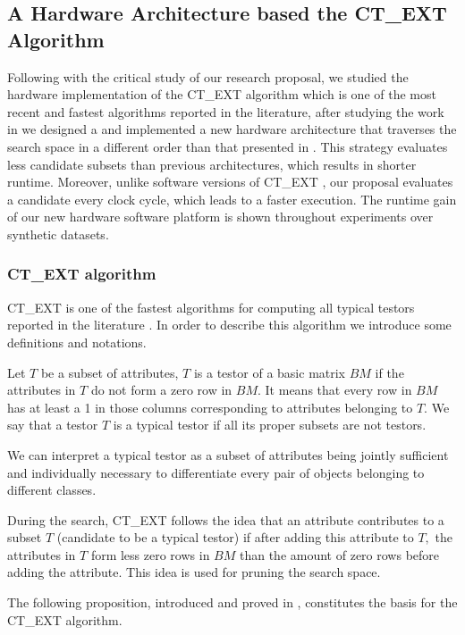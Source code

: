 \documentclass[authoryear,11pt]{elsarticle}
\begin{document}
\subsection{A Hardware Architecture based the CT\_EXT Algorithm}\label{CTH}
	Following with the critical study of our research proposal, we studied the hardware implementation of the 
	CT\_EXT algorithm which is one of the most recent and fastest algorithms reported in the literature, after
	studying the work in \citep{Rojas12} we designed a and implemented a new hardware architecture that traverses
	the search space in a different order than that presented in \citep{Rojas07, Rojas12,Rodriguez14}.
	This strategy evaluates less
	candidate subsets than previous architectures, which results in shorter runtime. Moreover, unlike 
	software versions of CT\_EXT \citep{Sanchez07, Sanchez10}, our proposal evaluates a candidate every clock 
	cycle, which leads to a faster execution. The runtime gain of our new hardware software platform is
	shown throughout	experiments over synthetic datasets.
	
\subsubsection{CT\_EXT algorithm}
	CT\_EXT is one of the fastest algorithms for computing all typical testors reported in the 
	literature \citep{Sanchez07,Sanchez10,Piza14}. In order to describe this algorithm we 
	introduce some definitions and notations.	
	
	Let $T$ be a subset of attributes, $T$ is a testor of a basic matrix $BM$ if the attributes in $T$ do 
	not form a zero row 	in $BM$. It means that every row in $BM$ has at least a 1 in those columns corresponding 
	to attributes belonging to $T$. We say that a testor $T$ is a typical testor if all its proper subsets 
	are not	testors.
	
	We can interpret a typical testor as a subset of attributes being jointly sufficient and individually
	necessary to differentiate every pair of objects belonging to different classes.
	
	During the search, CT\_EXT follows the idea that an attribute contributes to a subset $T$ (candidate to 
	be a typical testor) if after adding this attribute to $T,$ the attributes in $T$ form less zero rows 
	in $BM$ than the amount of zero rows before adding the attribute. This idea is used for pruning the search
	space.
	
	The following proposition, introduced and proved in \citep{Sanchez07}, constitutes the basis for the CT\_EXT
	algorithm.
	
\end{document}
